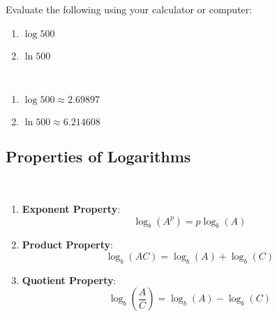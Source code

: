 \begin{example}
    Evaluate the following using your calculator or computer:

    \begin{enumerate}
        \item $\log 500$
        \item $\ln 500$
    \end{enumerate}
\end{example}
\begin{solution}~

    \begin{enumerate}
        \item $\log 500 \approx 2.69897$
        \item $\ln 500 \approx 6.214608$
    \end{enumerate}
\end{solution}


\subsection{Properties of Logarithms}

\begin{summarybox}~

    \begin{enumerate}
        \item \textbf{Exponent Property}: $$\log_b(A^p) = p\log_b(A)$$
        \item \textbf{Product Property}: $$\log_b(AC) = \log_b(A) + \log_b(C)$$
        \item \textbf{Quotient Property}: $$\log_b\left(\frac{A}{C}\right) = \log_b(A) - \log_b(C)$$
    \end{enumerate}
\end{summarybox}

